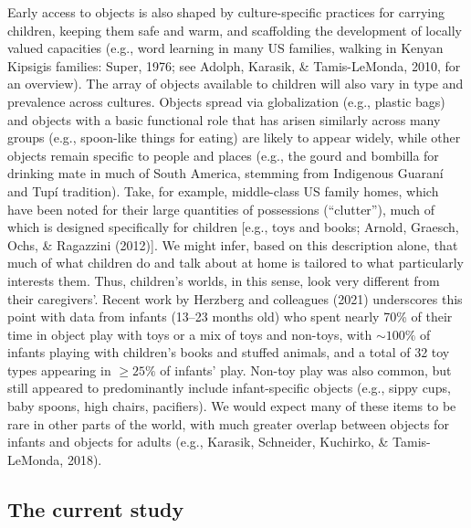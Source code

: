 \documentclass[10pt, letterpaper]{article}
\begin{document}
Early access to objects is also shaped by culture-specific practices for
carrying children, keeping them safe and warm, and scaffolding the
development of locally valued capacities (e.g., word learning in many US
families, walking in Kenyan Kipsigis families: Super, 1976; see Adolph,
Karasik, \& Tamis-LeMonda, 2010, for an overview). The array of objects
available to children will also vary in type and prevalence across
cultures. Objects spread via globalization (e.g., plastic bags) and
objects with a basic functional role that has arisen similarly across
many groups (e.g., spoon-like things for eating) are likely to appear
widely, while other objects remain specific to people and places (e.g.,
the gourd and bombilla for drinking mate in much of South America,
stemming from Indigenous Guaraní and Tupí tradition). Take, for example,
middle-class US family homes, which have been noted for their large
quantities of possessions (``clutter''), much of which is designed
specifically for children {[}e.g., toys and books; Arnold, Graesch,
Ochs, \& Ragazzini (2012){]}. We might infer, based on this description
alone, that much of what children do and talk about at home is tailored
to what particularly interests them. Thus, children's worlds, in this
sense, look very different from their caregivers'. Recent work by
Herzberg and colleagues (2021) underscores this point with data from
infants (13--23 months old) who spent nearly 70\% of their time in
object play with toys or a mix of toys and non-toys, with
\({\sim}100\%\) of infants playing with children's books and stuffed
animals, and a total of 32 toy types appearing in \({\ge}25\%\) of
infants' play. Non-toy play was also common, but still appeared to
predominantly include infant-specific objects (e.g., sippy cups, baby
spoons, high chairs, pacifiers). We would expect many of these items to
be rare in other parts of the world, with much greater overlap between
objects for infants and objects for adults (e.g., Karasik, Schneider,
Kuchirko, \& Tamis-LeMonda, 2018).

\hypertarget{the-current-study}{%
\subsection{The current study}\label{the-current-study}}
\end{document}
